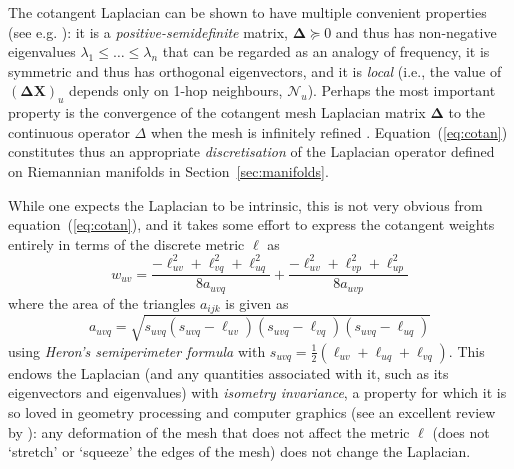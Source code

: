 The cotangent Laplacian can be shown to have multiple convenient properties (see e.g. \cite{wardetzky2007discrete}): it is a {\em positive-semidefinite} matrix, $\boldsymbol{\Delta} \succcurlyeq 0$ and thus has non-negative eigenvalues $\lambda_1 \leq \hdots \leq \lambda_n$ that can be regarded as an analogy of frequency, it is symmetric and thus has orthogonal eigenvectors, and it is {\em local} (i.e., the value of $(\boldsymbol{\Delta}\mathbf{X})_u$ depends only on 1-hop neighbours, $\mathcal{N}_u$).
%
Perhaps the most important property is the convergence of the cotangent mesh Laplacian matrix $\boldsymbol{\Delta}$ to the continuous operator $\Delta$ when the mesh is infinitely refined \citep{wardetzky2008convergence}.  Equation~(\ref{eq:cotan}) constitutes thus an appropriate {\em discretisation} of the Laplacian operator defined on Riemannian manifolds in Section~\ref{sec:manifolds}. 


While one expects the Laplacian to be intrinsic, this is not very obvious from equation~(\ref{eq:cotan}), and it takes some effort to %
express the cotangent weights entirely in terms of the discrete metric $\ell$ as 
$$
w_{uv} = \frac{-\ell^2_{uv} + \ell^2_{vq} + \ell^2_{uq} }{8 a_{uvq}} + 
\frac{-\ell^2_{uv} + \ell^2_{vp} + \ell^2_{up} }{8 a_{uvp}}
$$
%
where the area of the triangles $a_{ijk}$ is given as  
$$
a_{uvq} = \sqrt{s_{uvq} (s_{uvq} - \ell_{uv}) (s_{uvq} - \ell_{vq}) (s_{uvq} - \ell_{uq}) }
$$
using {\em Heron's semiperimeter formula} with 
$s_{uvq} = \frac{1}{2}(\ell_{uv} + \ell_{uq} + \ell_{vq})$. 
%
%
This endows the Laplacian (and any quantities associated with it, such as its eigenvectors and eigenvalues) with {\em isometry invariance}, a property for which it is so loved in geometry processing and computer graphics (see an excellent review by \cite{wang2019intrinsic}): any deformation of the mesh that does not affect the metric $\ell$ (does not `stretch' or `squeeze' the edges of the mesh) does not change the Laplacian.




